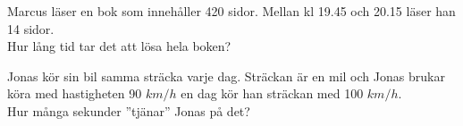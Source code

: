 



\begin{displayquote}
\textcolor{turkos}{Marcus läser en bok som innehåller 420 sidor. Mellan kl 19.45 och 20.15 läser han 14 sidor. \\
Hur lång tid tar det att lösa hela boken?}
\end{displayquote}


\begin{displayquote}
\textcolor{turkos}{Jonas kör sin bil samma sträcka varje dag. Sträckan är en mil och Jonas brukar köra med hastigheten 90 $km/h$ en dag kör han sträckan med 100 $km/h$. \\
Hur många sekunder ''tjänar'' Jonas på det?}
\end{displayquote}


